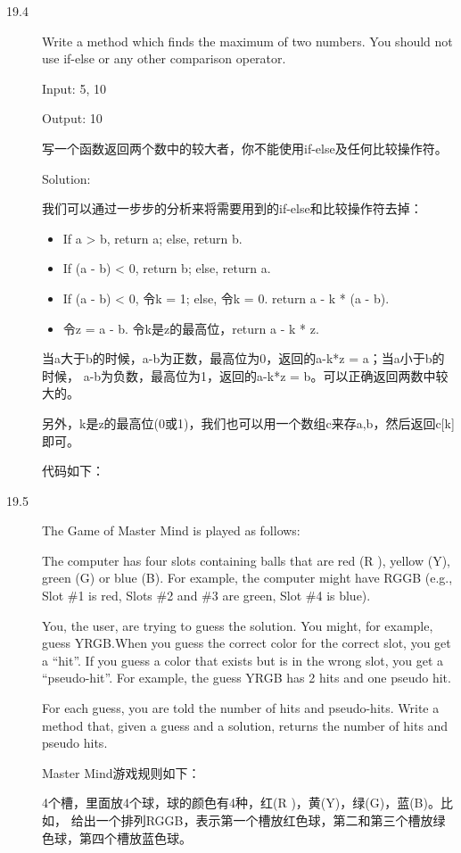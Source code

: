 \begin{description}
%


\item[19.4] Write a method which finds the maximum of two numbers. You should not use if-else or any other comparison operator.

Input: 5, 10

Output: 10

写一个函数返回两个数中的较大者，你不能使用if-else及任何比较操作符。

Solution: 

我们可以通过一步步的分析来将需要用到的if-else和比较操作符去掉：
\begin{itemize}
  \itemsep=-3pt
\item If a > b, return a; else, return b.
\item If (a - b) < 0, return b; else, return a.
\item If (a - b) < 0, 令k = 1; else, 令k = 0. return a - k * (a - b).
\item 令z = a - b. 令k是z的最高位，return a - k * z.
\end{itemize}
当a大于b的时候，a-b为正数，最高位为0，返回的a-k*z = a；当a小于b的时候， a-b为负数，最高位为1，返回的a-k*z = b。可以正确返回两数中较大的。

另外，k是z的最高位(0或1)，我们也可以用一个数组c来存a,b，然后返回c[k]即可。

代码如下：



\item[19.5] The Game of Master Mind is played as follows:

The computer has four slots containing balls that are red (R ), yellow (Y), green (G) or blue (B). For example, the computer might have RGGB (e.g., Slot \#1 is red, Slots \#2 and \#3 are green, Slot \#4 is blue).

You, the user, are trying to guess the solution. You might, for example, guess YRGB.When you guess the correct color for the correct slot, you get a “hit”. If you guess a color that exists but is in the wrong slot, you get a “pseudo-hit”. For example, the guess YRGB has 2 hits and one pseudo hit.

For each guess, you are told the number of hits and pseudo-hits. Write a method that, given a guess and a solution, returns the number of hits and pseudo hits.

Master Mind游戏规则如下：

4个槽，里面放4个球，球的颜色有4种，红(R )，黄(Y)，绿(G)，蓝(B)。比如， 给出一个排列RGGB，表示第一个槽放红色球，第二和第三个槽放绿色球，第四个槽放蓝色球。


\end{description}
